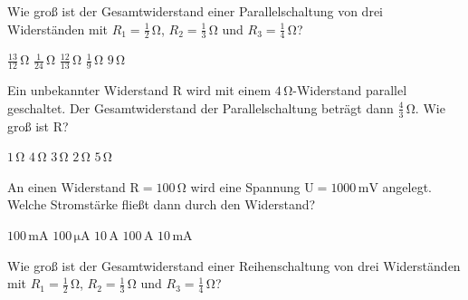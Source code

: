 \documentclass[11pt]{exam}
\begin{document}
\setlength{\voffset}{-0.5in}
\setlength{\headsep}{5pt}

\hspace{2mm}
 \hspace{5mm}
\vspace{4mm}

\begin{questions}

\question Wie groß ist der Gesamtwiderstand einer Parallelschaltung von drei Widerständen mit \(R_1=\mathrm{\frac{1}{2}\,\Omega}\), \(R_2=\mathrm{\frac{1}{3}\,\Omega}\) und \(R_3=\mathrm{\frac{1}{4}\,\Omega}\)?

\begin{choices}
	\choice \(\mathrm{\frac{13}{12}\,\Omega}\)
	\choice \(\mathrm{\frac{1}{24}\,\Omega}\)
	\choice \(\mathrm{\frac{12}{13}\,\Omega}\)
	\choice \(\mathrm{\frac{1}{9}\,\Omega}\)
	\choice \(\mathrm{9\,\Omega}\)
\end{choices}

\vspace{3mm}\question Ein unbekannter Widerstand \(\mathrm{R}\) wird mit einem \(\mathrm{4\,\Omega}\)-Widerstand parallel geschaltet. Der Gesamtwiderstand der Parallelschaltung beträgt dann \(\mathrm{\frac{4}{3}\,\Omega}\). Wie groß ist \(\mathrm{R}\)?

\begin{choices}
	\choice \(\mathrm{1\,\Omega}\)
	\choice \(\mathrm{4\,\Omega}\)
	\choice \(\mathrm{3\,\Omega}\)
	\choice \(\mathrm{2\,\Omega}\)
	\choice \(\mathrm{5\,\Omega}\)
\end{choices}

\vspace{3mm}\question An einen Widerstand \(\mathrm{R=100\,\Omega}\) wird eine Spannung \(\mathrm{U=1000\,mV}\) angelegt. Welche Stromstärke fließt dann durch den Widerstand?

\begin{choices}
	\choice \(\mathrm{100\,mA}\)
	\choice \(\mathrm{100\,\mu A}\)
	\choice \(\mathrm{10\,A}\)
	\choice \(\mathrm{100\,A}\)
	\choice \(\mathrm{10\,mA}\)
\end{choices}

\vspace{3mm}\question Wie groß ist der Gesamtwiderstand einer Reihenschaltung von drei Widerständen mit \(R_1=\mathrm{\frac{1}{2}\,\Omega}\), \(R_2=\mathrm{\frac{1}{3}\,\Omega}\) und \(R_3=\mathrm{\frac{1}{4}\,\Omega}\)?


\end{questions}
\end{document}
